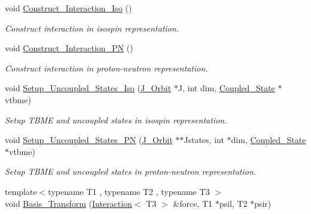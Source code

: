 \begin{DoxyCompactItemize}
void \hyperlink{class_interaction_ae6f2362eebdf933d63c8133328fbf0f7}{Construct\-\_\-\-Interaction\-\_\-\-Iso} ()
\begin{DoxyCompactList}\small\item\em Construct interaction in isospin representation. \end{DoxyCompactList}\item 
void \hyperlink{class_interaction_a42aceecb46825fe9c78b71a00f888206}{Construct\-\_\-\-Interaction\-\_\-\-P\-N} ()
\begin{DoxyCompactList}\small\item\em Construct interaction in proton-\/neutron representation. \end{DoxyCompactList}\item 
void \hyperlink{class_interaction_ae16c26ed612f825cfa114b0ca9a4fbc2}{Setup\-\_\-\-Uncoupled\-\_\-\-States\-\_\-\-Iso} (\hyperlink{class_j___orbit}{J\-\_\-\-Orbit} $\ast$J, int dim, \hyperlink{struct_coupled___state}{Coupled\-\_\-\-State} $\ast$vtbme)
\begin{DoxyCompactList}\small\item\em Setup T\-B\-M\-E and uncoupled states in isospin representation. \end{DoxyCompactList}\item 
void \hyperlink{class_interaction_a34f5f4258d6b5acb0cb228ff82855ed6}{Setup\-\_\-\-Uncoupled\-\_\-\-States\-\_\-\-P\-N} (\hyperlink{class_j___orbit}{J\-\_\-\-Orbit} $\ast$$\ast$Jstates, int $\ast$dim, \hyperlink{struct_coupled___state}{Coupled\-\_\-\-State} $\ast$vtbme)
\begin{DoxyCompactList}\small\item\em Setup T\-B\-M\-E and uncoupled states in proton-\/neutron representation. \end{DoxyCompactList}\item 
{\footnotesize template$<$typename T1 , typename T2 , typename T3 $>$ }\\void \hyperlink{class_interaction_aa840d7de0932cb51370619a8033b7800}{Basis\-\_\-\-Transform} (\hyperlink{class_interaction}{Interaction}$<$ T3 $>$ \&force, T1 $\ast$psil, T2 $\ast$psir)
\end{DoxyCompactItemize}

